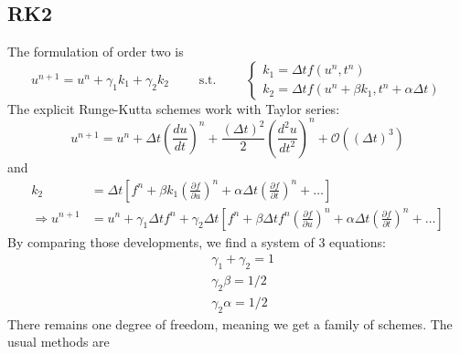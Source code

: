 \documentclass[12pt, openany]{report}
\renewcommand{\O}{\mathcal{O}}
\theoremstyle{definition}
\begin{document}
\subsection{RK2}
The formulation of order two is 
\begin{equation}
	u^{n+1} = u^n + \gamma_1 k_1 + \gamma_2 k_2 \qquad \text{ s.t. }\qquad \begin{cases}
		k_1 = \Delta t f(u^n, t^n)\\
		k_2 = \Delta t f(u^n + \beta k_1, t^n +\alpha \Delta t)
	\end{cases}
\end{equation}
The explicit Runge-Kutta schemes work with Taylor series:
\begin{equation}
	u^{n+1} = u^n + \Delta t \left(\frac{du}{dt}\right)^n + \frac{(\Delta t)^2}{2} \left(\frac{d^2u}{dt^2}\right)^n + \O((\Delta t)^3)
\end{equation}
and
\begin{equation}
	\begin{aligned}
		k_2 &= \Delta t \left[f^n + \beta k_1\left(\frac{\partial f}{\partial u}\right)^n + \alpha \Delta t \left(\frac{\partial f}{\partial t}\right)^n + \dots \right]\\
		\Longrightarrow u^{n+1} &= u^n + \gamma_1 \Delta tf^n + \gamma_2 \Delta t\left[f^n + \beta \Delta tf^n \left(\frac{\partial f}{\partial u}\right)^n + \alpha \Delta t\left(\frac{\partial f}{\partial t}\right)^n + \dots \right]
	\end{aligned}
\end{equation}
By comparing those developments, we find a system of 3 equations:
\begin{equation}
	\begin{aligned}
		&\gamma_1 + \gamma_2 = 1 \\
		&\gamma_2 \beta = 1/2\\
		&\gamma_2 \alpha = 1/2 
	\end{aligned}
\end{equation}
There remains one degree of freedom, meaning we get a family of schemes. The usual methods are 
\end{document}
